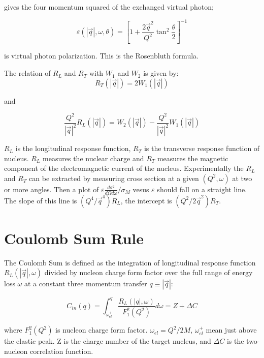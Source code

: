 gives the four momentum squared of the exchanged virtual photon;

\begin{equation}
  \varepsilon(|\vec{q}|,\omega,\theta) =\left[1+\frac{2\vec{q}^2}{Q^2}\tan^2\frac{\theta}{2}\right]^{-1}
\end{equation}

is virtual photon polarization.
This is the Rosenbluth formula.

The relation of $R_L$ and $R_T$ with $W_1$ and $W_2$ is given by: 
\begin{equation}
R_T(|\vec{q}|)=2W_1(|\vec{q}|)
\end{equation}

and

\begin{equation}
\frac{Q^2}{|\vec{q}|^2}R_L(|\vec{q}|)=W_2(|\vec{q}|) - \frac{Q^2}{|\vec{q}|^2}W_1(|\vec{q}|)
\end{equation}

$R_L$ is the longitudinal response function, $R_T$ is the transverse response function of nucleus.
$R_L$ measures the nuclear charge and $R_T$ measures the magnetic component of the electromagnetic current of the
nucleus. Experimentally the $R_L$ and $R_T$ can be extracted by measuring cross section at a given $(Q^2,\omega)$ at
two or more angles. Then a plot of $\varepsilon \frac{d\sigma^2}{d\Omega d\omega}/\sigma_M$ vesus $\varepsilon$ should 
fall on a straight line. The slope of this line is $(Q^4/\vec{q}^4)R_L$, the intercept is $(Q^2/2\vec{q}^2)R_T$.

\section{Coulomb Sum Rule}

The Coulomb Sum is defined as the integration of longitudinal response function $R_L(|\vec{q}|,\omega)$ divided by 
nucleon charge form factor over the full range of energy loss $\omega$ at a constant three momentum transfer $q \equiv |\vec{q}|$:

\begin{equation}
C_{in}(q) = \int_{\omega_{el}^{+}}^{q} \frac{R_L(|q|,\omega)}{F_1^2(Q^2)} d\omega = Z + \Delta C
\end{equation}

where $F_1^2(Q^2)$ is nucleon charge form factor. $\omega_{el} = Q^2/2M$, $\omega_{el}^{+}$ mean just above the elastic peak. 
Z is the charge number of the target nucleus, and $\Delta C$ is the two-nucleon correlation function.

